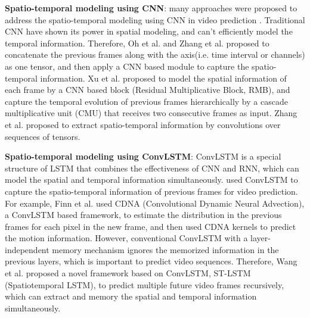 \documentclass[journal]{IEEEtran}
\begin{document}
{\bf Spatio-temporal modeling using CNN}: many approaches were proposed to address the spatio-temporal modeling using CNN in video prediction \cite{acvpag,dmspms,dstc2fp,dpstd,predcnn}. Traditional CNN have shown its power in spatial modeling, and can't efficiently model the temporal information. Therefore, Oh et al.\cite{acvpag} and Zhang et al.\cite{dstc2fp} proposed to concatenate the previous frames along with the axis(i.e. time interval or channels) as one tensor, and then apply a CNN based module to capture the spatio-temporal information. Xu et al. \cite{predcnn} proposed to model the spatial information of each frame by a CNN based block (Residual Multiplicative Block, RMB), and capture the temporal evolution of previous frames hierarchically by a cascade multiplicative unit (CMU) that receives two consecutive frames as input. Zhang et al.\cite{dpstd} proposed to extract spatio-temporal information by convolutions over sequences of tensors.

{\bf Spatio-temporal modeling using ConvLSTM}: ConvLSTM \cite{convlstm} is a special structure of LSTM that combines the effectiveness of CNN and RNN, which can model the spatial and temporal information simultaneously. \cite{ulpivp,predrnn,predrnn2} used ConvLSTM to capture the spatio-temporal information of previous frames for video prediction. For example, Finn et al. \cite{ulpivp} used CDNA (Convolutional Dynamic Neural Advection), a ConvLSTM based framework, to estimate the distribution in the previous frames for each pixel in the new frame, and then used CDNA kernels to predict the motion information. However, conventional ConvLSTM with a layer-independent memory mechanism ignores the memorized information in the previous layers, which is important to predict video sequences. Therefore, Wang et al. \cite{predrnn} proposed a novel framework based on ConvLSTM, ST-LSTM (Spatiotemporal LSTM), to predict multiple future video frames recursively, which can extract and memory the spatial and temporal information simultaneously.
\end{document}
